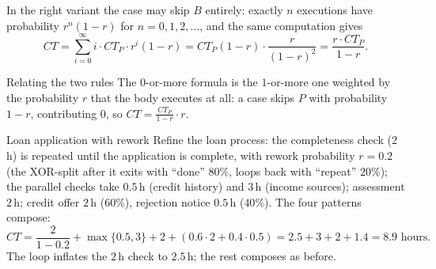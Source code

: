 In the right variant the case may skip $B$ entirely: exactly $n$ executions have probability $r^n (1 - r)$ for $n = 0, 1, 2, \ldots$, and the same computation gives
$$CT = \sum_{i=0}^{\infty} i \cdot CT_P \cdot r^{i} (1 - r) = CT_P (1 - r) \cdot \frac{r}{(1 - r)^2} = \frac{r \cdot CT_P}{1 - r}.$$
\begin{notebox}{Relating the two rules}
The $0$-or-more formula is the $1$-or-more one weighted by the probability $r$ that the body executes at all: a case skips $P$ with probability $1 - r$, contributing $0$, so $CT = \frac{CT_P}{1-r} \cdot r$.
\end{notebox}

\begin{examplebox}{Loan application with rework}
Refine the loan process: the completeness check ($2$\,h) is repeated until the application is complete, with rework probability $r = 0.2$ (the XOR-split after it exits with ``done'' $80\%$, loops back with ``repeat'' $20\%$); the parallel checks take $0.5$\,h (credit history) and $3$\,h (income sources); assessment $2$\,h; credit offer $2$\,h ($60\%$), rejection notice $0.5$\,h ($40\%$). The four patterns compose:
$$CT = \frac{2}{1 - 0.2} + \max\{0.5, 3\} + 2 + (0.6 \cdot 2 + 0.4 \cdot 0.5) = 2.5 + 3 + 2 + 1.4 = 8.9 \text{ hours}.$$
The loop inflates the $2$\,h check to $2.5$\,h; the rest composes as before.
\end{examplebox}

